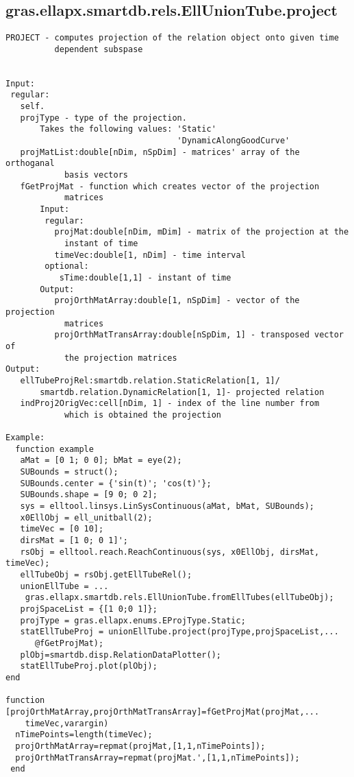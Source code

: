 \subsection{\texorpdfstring{gras.ellapx.smartdb.rels.EllUnionTube.project}{project}}\label{method:gras.ellapx.smartdb.rels.EllUnionTube.project}
\begin{verbatim}
PROJECT - computes projection of the relation object onto given time
          dependent subspase


Input:
 regular:
   self.
   projType - type of the projection.
       Takes the following values: 'Static'
                                   'DynamicAlongGoodCurve'
   projMatList:double[nDim, nSpDim] - matrices' array of the orthoganal
            basis vectors
   fGetProjMat - function which creates vector of the projection
            matrices
       Input:
        regular:
          projMat:double[nDim, mDim] - matrix of the projection at the
            instant of time
          timeVec:double[1, nDim] - time interval
        optional:
           sTime:double[1,1] - instant of time
       Output:
          projOrthMatArray:double[1, nSpDim] - vector of the projection
            matrices
          projOrthMatTransArray:double[nSpDim, 1] - transposed vector of
            the projection matrices
Output:
   ellTubeProjRel:smartdb.relation.StaticRelation[1, 1]/
       smartdb.relation.DynamicRelation[1, 1]- projected relation
   indProj2OrigVec:cell[nDim, 1] - index of the line number from
            which is obtained the projection

Example:
  function example
   aMat = [0 1; 0 0]; bMat = eye(2);
   SUBounds = struct();
   SUBounds.center = {'sin(t)'; 'cos(t)'};
   SUBounds.shape = [9 0; 0 2];
   sys = elltool.linsys.LinSysContinuous(aMat, bMat, SUBounds);
   x0EllObj = ell_unitball(2);
   timeVec = [0 10];
   dirsMat = [1 0; 0 1]';
   rsObj = elltool.reach.ReachContinuous(sys, x0EllObj, dirsMat, timeVec);
   ellTubeObj = rsObj.getEllTubeRel();
   unionEllTube = ...
    gras.ellapx.smartdb.rels.EllUnionTube.fromEllTubes(ellTubeObj);
   projSpaceList = {[1 0;0 1]};
   projType = gras.ellapx.enums.EProjType.Static;
   statEllTubeProj = unionEllTube.project(projType,projSpaceList,...
      @fGetProjMat);
   plObj=smartdb.disp.RelationDataPlotter();
   statEllTubeProj.plot(plObj);
end

function [projOrthMatArray,projOrthMatTransArray]=fGetProjMat(projMat,...
    timeVec,varargin)
  nTimePoints=length(timeVec);
  projOrthMatArray=repmat(projMat,[1,1,nTimePoints]);
  projOrthMatTransArray=repmat(projMat.',[1,1,nTimePoints]);
 end
\end{verbatim}
